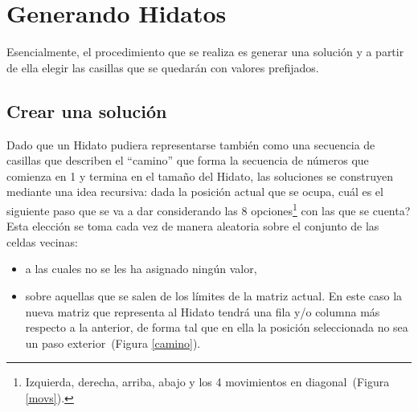 \documentclass{llncs}
\begin{document}

\section{Generando Hidatos}
Esencialmente, el procedimiento que se realiza es generar una soluci\'on y a partir de ella elegir las casillas que se quedar\'an con valores prefijados. 

\subsection{Crear una soluci\'on}
Dado que un Hidato pudiera representarse tambi\'en como una secuencia de casillas que describen el ``camino'' que forma la secuencia de n\'umeros que comienza en 1 y termina en el tama\~no del Hidato, las soluciones se construyen mediante una idea recursiva: dada la posici\'on actual que se ocupa, cu\'al es el siguiente paso que se va a dar considerando las 8 opciones\footnote{Izquierda, derecha, arriba, abajo y los 4 movimientos en diagonal~(Figura \ref{movs}).} con las que se cuenta?
Esta elecci\'on se toma cada vez de manera aleatoria sobre el conjunto de las celdas vecinas:
\begin{itemize}
\item a las cuales no se les ha asignado ning\'un valor,
\item sobre aquellas que se salen de los l\'imites de la matriz actual. En este caso la nueva matriz que representa al Hidato tendr\'a una fila y/o columna m\'as respecto a la anterior, de forma tal que en ella la posici\'on seleccionada no sea un paso exterior~(Figura \ref{camino}). 
\end{itemize}
\end{document}
